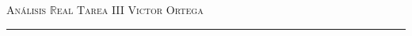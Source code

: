\documentclass[12pt]{article}
\newcommand\R{\ensuremath{\mathbb{R}}}
\begin{document}
\thispagestyle{empty}

{\scshape Análisis $\R$eal} \hfill {\scshape \large Tarea III} \hfill {\scshape Victor Ortega}
 
\smallskip

\hrule

\bigskip

\bigskip

\theoremstyle{definition}
\newtheorem*{definition}{Definición}

\theoremstyle{definition}
\newtheorem*{dem}{Demostración}

\theoremstyle{definition}
\newtheorem*{notation}{Notación}

\theoremstyle{definition}
\newtheorem*{theorem}{Teorema}

\theoremstyle{definition}
\newtheorem*{lema}{Lema}

\theoremstyle{remark}
\newtheorem*{observation}{Observación}

\theoremstyle{remark}
\newtheorem*{example}{Ejemplo}
\end{document}
